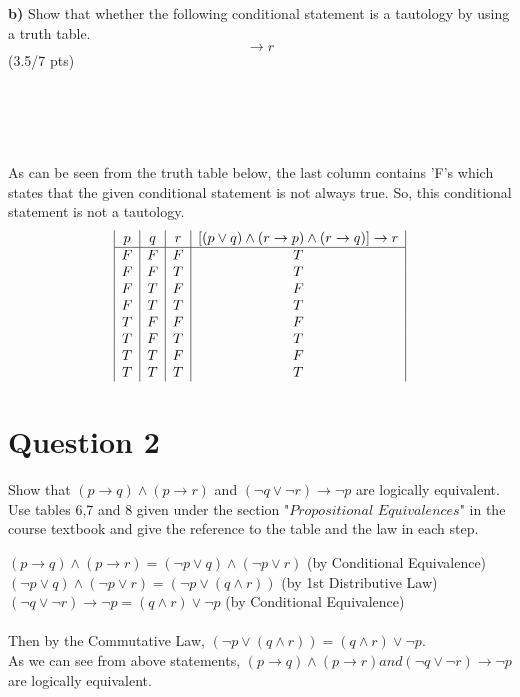 \documentclass[a4paper,12pt]{article}
\newcommand\tab[1][1cm]{\hspace*{#1}}
\begin{document}
\tab \textbf{b)} Show that whether the following conditional statement is a tautology by using a truth table.
\begin{equation*}
    [(p \vee q) \wedge (r \rightarrow p) \wedge (r \rightarrow q)] \rightarrow r
\end{equation*}
\hfill \small{(3.5/7 pts)}\\
\\
\\
\\
\\
\begin{tcolorbox}
\text As can be seen from the truth table below, the last column contains 'F's which states that the given conditional statement is not always true. So, this conditional statement is not a tautology.
\begin{displaymath}
\begin{array}{|c |c|c|c|}
p & q & r & [(p \vee q) \wedge (r \rightarrow p) \wedge (r \rightarrow q)] \rightarrow r  \\
\hline
F & F & F & T \\
F & F & T & T \\
F & T & F & F \\
F & T & T & T \\
T & F & F & F \\
T & F & T & T \\
T & T & F & F \\
T & T & T & T \\
\end{array}
\end{displaymath}
\end{tcolorbox}

\newpage
\section*{Question 2 \hfill {}}
\tab Show that $(p \rightarrow q) \wedge (p \rightarrow r)$ and $(\neg q \vee \neg r)\rightarrow \neg p$ are logically equivalent. Use tables 6,7 and 8 given under the section "$\textit{Propositional Equivalences}$" in the course textbook and give the reference to the table and the law in each step.

\begin{tcolorbox}

\tab $(p \rightarrow q) \wedge (p \rightarrow r) = (\neg p \vee q) \wedge (\neg p \vee r)$ (by Conditional Equivalence) \\
\tab $(\neg p \vee q) \wedge (\neg p \vee r) = (\neg p \vee (q \wedge r))$ (by 1st Distributive Law) \\
\tab $(\neg q \vee \neg r)\rightarrow \neg p = (q \wedge r) \vee \neg p$ (by Conditional Equivalence) \\
\\
\tab Then by the Commutative Law, $(\neg p \vee (q \wedge r)) = (q \wedge r) \vee \neg p$. \\
\tab As we can see from above statements, $(p \rightarrow q) \wedge (p \rightarrow r) and (\neg q \vee \neg r)\rightarrow \neg p$ are logically equivalent. \

\end{tcolorbox}
\newpage
\end{document}
